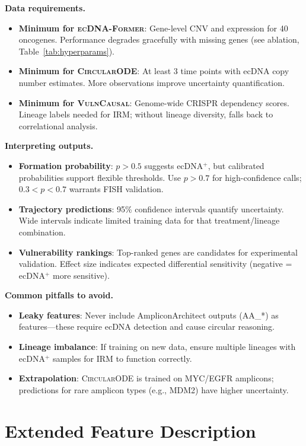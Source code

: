 \documentclass[sigconf,anonymous]{acmart}
\newcommand{\former}{\textsc{ecDNA-Former}}
\newcommand{\circularode}{\textsc{CircularODE}}
\newcommand{\vulncausal}{\textsc{VulnCausal}}
\begin{document}
\textbf{Data requirements.}
\begin{itemize}[leftmargin=*, itemsep=2pt]
    \item \textbf{Minimum for \former{}}: Gene-level CNV and expression for 40 oncogenes. Performance degrades gracefully with missing genes (see ablation, Table~\ref{tab:hyperparams}).
    \item \textbf{Minimum for \circularode{}}: At least 3 time points with ecDNA copy number estimates. More observations improve uncertainty quantification.
    \item \textbf{Minimum for \vulncausal{}}: Genome-wide CRISPR dependency scores. Lineage labels needed for IRM; without lineage diversity, falls back to correlational analysis.
\end{itemize}

\textbf{Interpreting outputs.}
\begin{itemize}[leftmargin=*, itemsep=2pt]
    \item \textbf{Formation probability}: $p > 0.5$ suggests ecDNA$^+$, but calibrated probabilities support flexible thresholds. Use $p > 0.7$ for high-confidence calls; $0.3 < p < 0.7$ warrants FISH validation.
    \item \textbf{Trajectory predictions}: 95\% confidence intervals quantify uncertainty. Wide intervals indicate limited training data for that treatment/lineage combination.
    \item \textbf{Vulnerability rankings}: Top-ranked genes are candidates for experimental validation. Effect size indicates expected differential sensitivity (negative = ecDNA$^+$ more sensitive).
\end{itemize}

\textbf{Common pitfalls to avoid.}
\begin{itemize}[leftmargin=*, itemsep=2pt]
    \item \textbf{Leaky features}: Never include AmpliconArchitect outputs (AA\_*) as features---these require ecDNA detection and cause circular reasoning.
    \item \textbf{Lineage imbalance}: If training on new data, ensure multiple lineages with ecDNA$^+$ samples for IRM to function correctly.
    \item \textbf{Extrapolation}: \circularode{} is trained on MYC/EGFR amplicons; predictions for rare amplicon types (e.g., MDM2) have higher uncertainty.
\end{itemize}


\section{Extended Feature Description}
\label{app:features}
\end{document}
